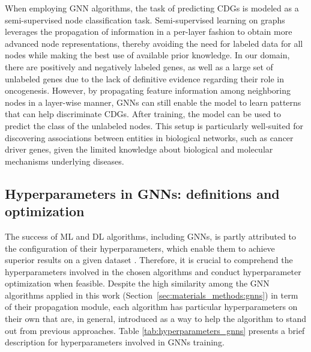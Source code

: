 When employing GNN algorithms, the task of predicting CDGs is modeled as a semi-supervised node classification task. Semi-supervised learning on graphs leverages the propagation of information in a per-layer fashion to obtain more advanced node representations, thereby avoiding the need for labeled data for all nodes while making the best use of available prior knowledge. In our domain, there are positively and negatively labeled genes, as well as a large set of unlabeled genes due to the lack of definitive evidence regarding their role in oncogenesis. However, by propagating feature information among neighboring nodes in a layer-wise manner, GNNs can still enable the model to learn patterns that can help discriminate CDGs.
After training, the model can be used to predict the class of the unlabeled nodes. This setup is particularly well-suited for discovering associations between entities in biological networks, such as cancer driver genes, given the limited knowledge about biological and molecular mechanisms underlying diseases.



\subsection{Hyperparameters in GNNs: definitions and optimization}
\label{sec:methods:hyperparameters}

The success of ML and DL algorithms, including GNNs, is partly attributed to the configuration of their hyperparameters, which enable them to achieve superior results on a given dataset \cite{yuan2021systematic}. Therefore, it is crucial to comprehend the hyperparameters involved in the chosen algorithms and conduct hyperparameter optimization when feasible. Despite the high similarity among the GNN algorithms applied in this work (Section~\ref{sec:materials_methods:gnns}) in term of their propagation module, each algorithm has particular hyperparameters on their own that are, in general, introduced as a way to help the algorithm to stand out from previous approaches. Table \ref{tab:hyperparameters_gnns} presents a brief description for hyperparameters involved in GNNs training.


